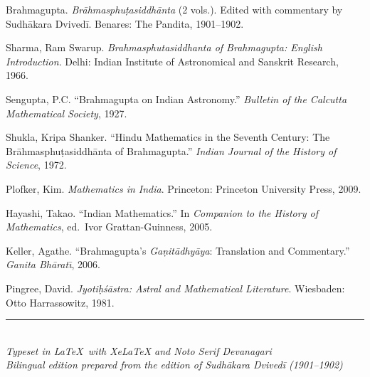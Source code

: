 \documentclass[11pt,a4paper]{article}
\begin{document}
\begin{enumerate}[label={[\arabic*]}]
  \item Brahmagupta. \textit{Brāhmasphuṭasiddhānta} (2 vols.). Edited with
  commentary by Sudhākara Dvivedī. Benares: The Pandita, 1901--1902.

  \item Sharma, Ram Swarup. \textit{Brahmasphutasiddhanta of Brahmagupta:
  English Introduction}. Delhi: Indian Institute of Astronomical and Sanskrit
  Research, 1966.

  \item Sengupta, P.C. ``Brahmagupta on Indian Astronomy.'' \textit{Bulletin
  of the Calcutta Mathematical Society}, 1927.

  \item Shukla, Kripa Shanker. ``Hindu Mathematics in the Seventh Century:
  The Brāhmasphuṭasiddhānta of Brahmagupta.'' \textit{Indian Journal of the
  History of Science}, 1972.

  \item Plofker, Kim. \textit{Mathematics in India}. Princeton: Princeton
  University Press, 2009.

  \item Hayashi, Takao. ``Indian Mathematics.'' In \textit{Companion to the
  History of Mathematics}, ed.\ Ivor Grattan-Guinness, 2005.

  \item Keller, Agathe. ``Brahmagupta's \textit{Gaṇitādhyāya}:
  Translation and Commentary.'' \textit{Ganita Bh\={a}rat\={\i}}, 2006.

  \item Pingree, David. \textit{Jyotiḥśāstra: Astral and Mathematical
  Literature}. Wiesbaden: Otto Harrassowitz, 1981.
\end{enumerate}

\vspace{1cm}
\begin{center}
\rule{0.6\textwidth}{0.4pt}\\[0.5cm]
{\small \textit{Typeset in \LaTeX\ with XeLaTeX and Noto Serif Devanagari}}\\
{\small \textit{Bilingual edition prepared from the edition of Sudhākara Dvivedī (1901--1902)}}
\end{center}
\end{document}
